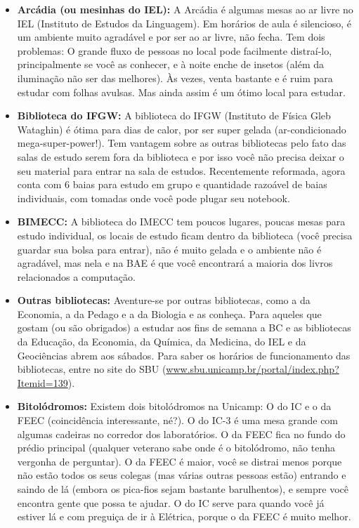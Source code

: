 \begin{itemize}
    \item  \textbf{Arcádia (ou mesinhas do IEL):} A Arcádia é algumas mesas ao ar
    livre no IEL (Instituto de Estudos da Linguagem). Em horários de aula
    é silencioso, é um ambiente muito agradável e por ser ao ar livre, não fecha.
    Tem dois problemas: O grande fluxo de pessoas no local pode facilmente
    distraí-lo, principalmente se você as conhecer, e à noite enche de insetos (além
    da iluminação não ser das melhores). Às vezes, venta bastante e é ruim para
    estudar com folhas avulsas. Mas ainda assim é um ótimo local para estudar.

    \item  \textbf{Biblioteca do IFGW:} A biblioteca do IFGW (Instituto de Física
    Gleb Wataghin) é ótima para dias de calor, por ser super gelada (ar-condicionado
    mega-super-power!). Tem vantagem sobre as outras bibliotecas pelo fato das salas
    de estudo serem fora da biblioteca e por isso você não precisa deixar o seu
    material para entrar na sala de estudos. Recentemente reformada, agora conta
    com 6 baias para estudo em grupo e quantidade razoável de baias individuais, com tomadas
    onde você pode plugar seu notebook.

    \item  \textbf{BIMECC:} A biblioteca do IMECC tem poucos lugares, poucas
    mesas para estudo individual, os locais de estudo ficam dentro da biblioteca
    (você precisa guardar sua bolsa para entrar), não é muito gelada
    e o ambiente não é agradável, mas nela e na BAE é que você encontrará
    a maioria dos livros relacionados a computação.

    \item  \textbf{Outras bibliotecas:} Aventure-se por outras bibliotecas, como
    a da Economia, a da Pedago e a da Biologia e as conheça. Para aqueles que
    gostam (ou são obrigados) a estudar aos fins de semana a BC e as bibliotecas
    da Educação, da Economia, da Química, da Medicina, do IEL e da Geociências
    abrem aos sábados. Para saber os horários de funcionamento das bibliotecas,
    entre no site do SBU (\url{www.sbu.unicamp.br/portal/index.php?Itemid=139}).

    \item  \textbf{Bitolódromos:} Existem dois bitolódromos na Unicamp: O do IC
    e o da FEEC (coincidência interessante, né?). O do IC-3 é uma mesa grande
    com algumas cadeiras no corredor dos laboratórios. O da FEEC fica no fundo do
    prédio principal (qualquer veterano sabe onde é o bitolódromo, não tenha
    vergonha de perguntar). O da FEEC é maior, você se distrai menos porque não
    estão todos os seus colegas (mas várias outras pessoas estão) entrando
    e saindo de lá (embora os pica-fios sejam bastante barulhentos), e sempre
    você encontra gente que possa te ajudar. O do IC serve para quando você já
    estiver lá e com preguiça de ir à Elétrica, porque o da FEEC é muito melhor.


\end{itemize}
